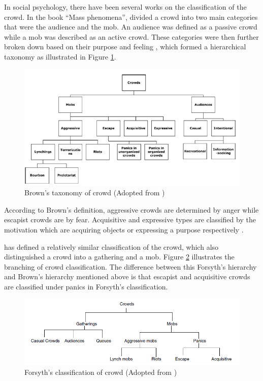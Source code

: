 In social psychology, there have been several works on the classification of the crowd. In the book ``Mass phenomena'', \citet{Brown1954} divided a crowd into two main categories that were the audience and the mob. An audience was defined as a passive crowd while a mob was described as an active crowd. These categories were then further broken down based on their purpose and feeling \citep{Pelechano2008}, which formed a hierarchical taxonomy as illustrated in Figure \ref{fig:brownCrowdType}.

\begin{figure}[!htbp] 
	\centering    
	\includegraphics[width=1.0\textwidth]{BrownCrowdType}
	\caption{Brown's taxonomy of crowd (Adopted from \citet{Pelechano2008})}
	\label{fig:brownCrowdType}
\end{figure}


According to Brown’s definition, aggressive crowds are determined by anger while escapist crowds are by fear. Acquisitive and expressive types are classified by the motivation which are acquiring objects or expressing a purpose respectively \citep{Durupinar2010}.

\citet{Forsyth2009} has defined a relatively similar classification of the crowd, which also distinguished a crowd into a gathering and a mob. Figure \ref{fig:forsythCrowdType} illustrates the branching of crowd classification. The difference between this Forsyth’s hierarchy and Brown’s hierarchy mentioned above is that escapist and acquisitive crowds are classified under panics in Forsyth's classification. 

\begin{figure}[!htbp]
	\centering    
	\includegraphics[width=1.0\textwidth]{ForsythCrowdType}
	\caption{Forsyth's classification of crowd (Adopted from \citet{klupfel2005models})}
	\label{fig:forsythCrowdType}
\end{figure}

